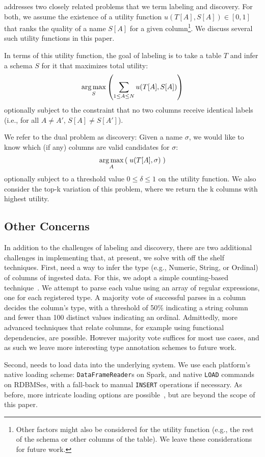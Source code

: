 \systemname addresses two closely related problems that we term labeling and discovery.
For both, we assume the existence of a utility function $u(T[A], S[A]) \in [0, 1]$ that ranks the quality of a name $S[A]$ for a given column\footnote{Other factors might also be considered for the utility function (e.g., the rest of the schema or other columns of the table).  We leave these considerations for future work.}.  
We discuss several such utility functions in this paper.

In terms of this utility function, the goal of labeling is to take a table $T$ and infer a schema $S$ for it that maximizes total utility:
$$\operatorname*{arg\,max}_{S}\left(\sum_{1 \leq A \leq N}u(T[A], S[A])\right)$$ 
optionally subject to the constraint that no two columns receive identical labels (i.e., for all $A \neq A'$, $S[A] \neq S[A']$).

We refer to the dual problem as discovery: Given a name $\sigma$, we would like to know which (if any) columns are valid candidates for $\sigma$:
$$\operatorname*{arg\,max}_{A}\left(\; u(T[A], \sigma)\;\right)$$
optionally subject to a threshold value $0 \leq \delta \leq 1$ on the utility function.  We also consider the top-k variation of this problem, where we return the k columns with highest utility.

\subsection{Other Concerns}
In addition to the challenges of labeling and discovery, there are two additional challenges in implementing \systemname that, at present, we solve with off the shelf techniques.
First, \systemname need a way to infer the type (e.g., Numeric, String, or Ordinal) of columns of ingested data.  
For this, we adopt a simple counting-based technique~\cite{yang2015lenses}.
We attempt to parse each value using an array of regular expressions, one for each registered type.
A majority vote of successful parses in a column decides the column's type, with a threshold of 50\% indicating a string column and fewer than 100 distinct values indicating an ordinal.
Admittedly, more advanced techniques that relate columns, for example using functional dependencies, are possible.
However majority vote suffices for most use cases, and as such we leave more interesting type annotation schemes to future work.

Second, \systemname needs to load data into the underlying system.  
We use each platform's native loading scheme: \texttt{DataFrameReader}s on Spark, and native \texttt{LOAD} commands on RDBMSes, with a fall-back to manual \texttt{INSERT} operations if necessary.
As before, more intricate loading options are possible~\cite{DBLP:conf/sigmod/AlagiannisBBIA12,DBLP:conf/cidr/IdreosKM07}, but are beyond the scope of this paper.







